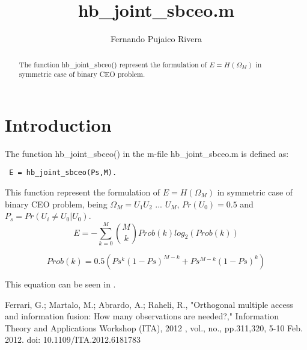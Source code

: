 \documentclass[a4paper,10pt]{article}
\title{hb\_joint\_sbceo.m}
\author{Fernando Pujaico Rivera}
\begin{document}
\maketitle
\begin{abstract}
The function hb\_joint\_sbceo() represent the formulation of $E = H(\Omega_M)$ 
in symmetric case of binary CEO problem.
\end{abstract}

\section{Introduction}
The function hb\_joint\_sbceo() in the m-file hb\_joint\_sbceo.m is defined as:
\lstset{language=octave}%
\begin{lstlisting}
 E = hb_joint_sbceo(Ps,M).
\end{lstlisting}
This function represent the formulation of $E=H(\Omega_M)$ in symmetric case 
of binary CEO problem,
being $\Omega_M=U_1 U_2$ $ ...$ $ U_M$, $Pr(U_0)=0.5$ and $P_s = Pr(U_i \neq U_0|U_0)$.
\begin{equation}
 E = -\sum_{k=0}^M \binom{M}{k} Prob(k)log_2( Prob(k) )
\end{equation}

\begin{equation}
 Prob(k)=0.5 ( Ps^k (1-Ps)^{M-k} + Ps^{M-k} (1-Ps)^k )
\end{equation}


This equation can be seen in \cite{shomega}.

\begin{thebibliography}{99}
 
Ferrari, G.; Martalo, M.; Abrardo, A.; Raheli, R., "Orthogonal multiple 
access and information fusion: How many observations are needed?," 
Information Theory and Applications Workshop (ITA), 2012 , vol., no., 
pp.311,320, 5-10 Feb. 2012. doi: 10.1109/ITA.2012.6181783

\end{thebibliography}  
\end{document}

